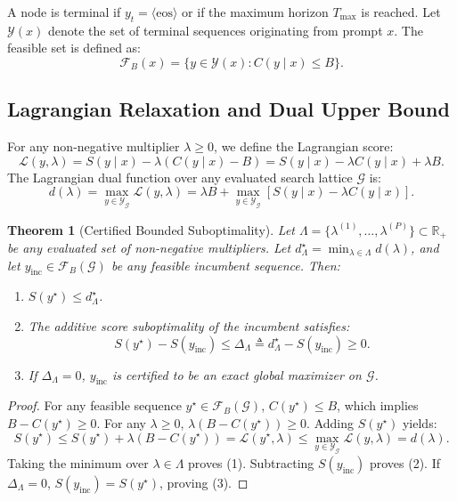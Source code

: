 \documentclass[11pt,a4paper]{article}
\theoremstyle{plain}
\newtheorem{theorem}{Theorem}
\theoremstyle{definition}
\theoremstyle{remark}
\begin{document}
A node is terminal if $y_t = \langle\text{eos}\rangle$ or if the maximum horizon $T_{\max}$ is reached. Let $\mathcal{Y}(x)$ denote the set of terminal sequences originating from prompt $x$. The feasible set is defined as:
\begin{equation}
\mathcal{F}_B(x) = \{ y \in \mathcal{Y}(x) : C(y \mid x) \le B \}.
\end{equation}

\subsection{Lagrangian Relaxation and Dual Upper Bound}
For any non-negative multiplier $\lambda \ge 0$, we define the Lagrangian score:
\begin{equation}
\mathcal{L}(y, \lambda) = S(y \mid x) - \lambda (C(y \mid x) - B) = S(y \mid x) - \lambda C(y \mid x) + \lambda B.
\end{equation}
The Lagrangian dual function over any evaluated search lattice $\mathcal{G}$ is:
\begin{equation}
d(\lambda) = \max_{y \in \mathcal{Y}_\mathcal{G}} \mathcal{L}(y, \lambda) = \lambda B + \max_{y \in \mathcal{Y}_\mathcal{G}} [ S(y \mid x) - \lambda C(y \mid x) ].
\end{equation}

\begin{theorem}[Certified Bounded Suboptimality]
\label{thm:dual_bound}
Let $\Lambda = \{\lambda^{(1)}, \dots, \lambda^{(P)}\} \subset \mathbb{R}_+$ be any evaluated set of non-negative multipliers. Let $d^\star_\Lambda = \min_{\lambda \in \Lambda} d(\lambda)$, and let $y_{\text{inc}} \in \mathcal{F}_B(\mathcal{G})$ be any feasible incumbent sequence. Then:
\begin{enumerate}
    \item $S(y^\star) \le d^\star_\Lambda$.
    \item The additive score suboptimality of the incumbent satisfies:
    \begin{equation}
    S(y^\star) - S(y_{\text{inc}}) \le \Delta_\Lambda \triangleq d^\star_\Lambda - S(y_{\text{inc}}) \ge 0.
    \end{equation}
    \item If $\Delta_\Lambda = 0$, $y_{\text{inc}}$ is certified to be an exact global maximizer on $\mathcal{G}$.
\end{enumerate}
\end{theorem}
\begin{proof}
For any feasible sequence $y^\star \in \mathcal{F}_B(\mathcal{G})$, $C(y^\star) \le B$, which implies $B - C(y^\star) \ge 0$. For any $\lambda \ge 0$, $\lambda (B - C(y^\star)) \ge 0$. Adding $S(y^\star)$ yields:
\begin{equation*}
S(y^\star) \le S(y^\star) + \lambda (B - C(y^\star)) = \mathcal{L}(y^\star, \lambda) \le \max_{y \in \mathcal{Y}_\mathcal{G}} \mathcal{L}(y, \lambda) = d(\lambda).
\end{equation*}
Taking the minimum over $\lambda \in \Lambda$ proves (1). Subtracting $S(y_{\text{inc}})$ proves (2). If $\Delta_\Lambda = 0$, $S(y_{\text{inc}}) = S(y^\star)$, proving (3).
\end{proof}
\end{document}
